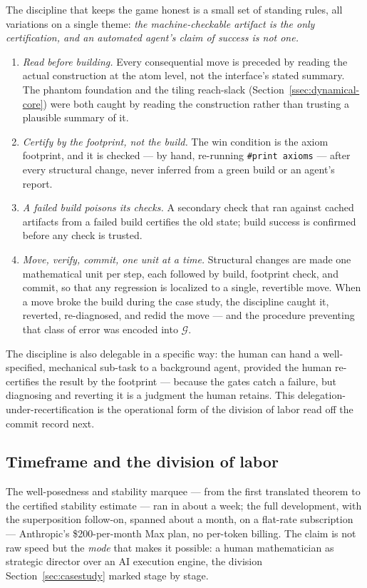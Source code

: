 \documentclass[11pt]{article}
\theoremstyle{plain}
\theoremstyle{definition}
\theoremstyle{remark}
\newcommand{\lean}[1]{\texttt{#1}}
\newcommand{\printaxioms}{\lean{\#print axioms}}
\begin{document}
The discipline that keeps the game honest is a small set of standing rules, all
variations on a single theme: \emph{the machine-checkable artifact is the only
certification, and an automated agent's claim of success is not one.}

\begin{enumerate}[leftmargin=2em]
\item \emph{Read before building.} Every consequential
move is preceded by reading the actual construction at the atom level, not the
interface's stated summary. The phantom foundation and the tiling reach-slack
(Section~\ref{ssec:dynamical-core}) were both caught by reading the construction
rather than trusting a plausible summary of it.
\item \emph{Certify by the footprint, not the build.}
The win condition is the axiom footprint, and it is checked --- by hand,
re-running \printaxioms{} --- after every structural change, never inferred from
a green build or an agent's report.
\item \emph{A failed build poisons its checks.} A
secondary check that ran against cached artifacts from a failed build certifies
the old state; build success is confirmed before any check is trusted.
\item \emph{Move, verify, commit, one unit at a time.} Structural changes are
made one mathematical unit per step, each followed by build, footprint check, and
commit, so that any regression is localized to a single, revertible move. When a
move broke the build during the case study, the discipline caught it, reverted,
re-diagnosed, and redid the move --- and the procedure preventing that class of
error was encoded into $\mathcal{G}$.
\end{enumerate}

The discipline is also delegable in a specific way: the human can hand a
well-specified, mechanical sub-task to a background agent, provided the human
re-certifies the result by the footprint --- because the gates catch a failure,
but diagnosing and reverting it is a judgment the human retains. This
delegation-under-recertification is the operational form of the division of labor read off
the commit record next.

\subsection{Timeframe and the division of labor}\label{ssec:timeframe}

The well-posedness and stability marquee --- from the first translated theorem to the
certified stability estimate --- ran in about a week; the full development, with the
superposition follow-on, spanned about a month, on a flat-rate subscription ---
Anthropic's \$200-per-month Max plan, no per-token billing. The claim is not raw speed but
the \emph{mode} that makes it possible: a human mathematician as strategic director
over an AI execution engine, the division Section~\ref{sec:casestudy} marked stage
by stage.
\end{document}
